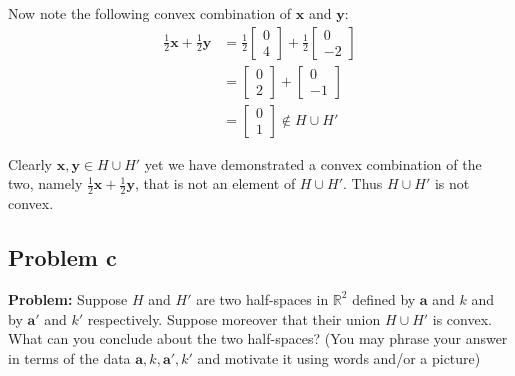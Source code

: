 \documentclass{article}
\renewcommand\vec{\mathbf}
\newcommand{\R}{\mathbb R}
\begin{document}
Now note the following convex combination of $\vec x$ and $\vec y$:
\begin{align*}
    \frac{1}{2}\vec x+\frac{1}{2}\vec y&=\frac{1}{2}\begin{bmatrix}
        0\\4
    \end{bmatrix}+\frac{1}{2}\begin{bmatrix}
        0\\-2
    \end{bmatrix}\\
    &=\begin{bmatrix}
        0\\2
    \end{bmatrix}+\begin{bmatrix}
        0\\-1
    \end{bmatrix}\\
    &=\begin{bmatrix}
        0\\1
    \end{bmatrix}\not\in H\cup H'\tag{$1\not\ge 2\wedge 1\not\le 0$}
\end{align*}

Clearly $\vec x,\vec y\in H\cup H'$ yet we have demonstrated a convex combination of the two, namely $\frac{1}{2}\vec x+\frac{1}{2}\vec y$, that is not an element of $H\cup H'$. Thus $H\cup H'$ is not convex.

\subsection*{Problem c}
\noindent\textbf{Problem:} Suppose $H$ and $H'$ are two half-spaces in $\R^2$ defined by $\vec a$ and $k$ and by $\vec a'$ and $k'$ respectively. Suppose moreover that their union $H\cup H'$ is convex. What can you conclude about the two half-spaces? (You may phrase your answer in terms of the data $\vec a, k, \vec a', k'$ and motivate it using words and/or a picture)
\bigskip
\end{document}
